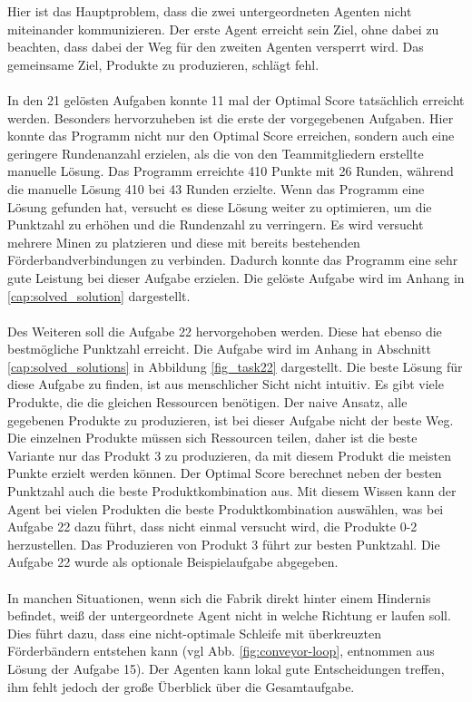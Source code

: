 Hier ist das Hauptproblem, dass die zwei untergeordneten Agenten nicht miteinander kommunizieren. Der erste Agent erreicht sein Ziel, ohne dabei zu beachten, dass dabei der Weg für den zweiten Agenten versperrt wird. Das gemeinsame Ziel, Produkte zu produzieren, schlägt fehl. 
\\\\
In den 21 gelösten Aufgaben konnte 11 mal der Optimal Score tatsächlich erreicht werden. Besonders hervorzuheben ist die erste der vorgegebenen Aufgaben.  Hier konnte das Programm nicht nur den Optimal Score erreichen, sondern auch eine geringere Rundenanzahl erzielen, als die von den Teammitgliedern erstellte manuelle Lösung. Das Programm erreichte 410 Punkte mit 26 Runden, während die manuelle Lösung 410 bei 43 Runden erzielte. Wenn das Programm eine Lösung gefunden hat, versucht es diese Lösung weiter zu optimieren, um die Punktzahl zu erhöhen und die Rundenzahl zu verringern. Es wird versucht mehrere Minen zu platzieren und diese mit bereits bestehenden Förderbandverbindungen zu verbinden. Dadurch konnte das Programm eine sehr gute Leistung bei dieser Aufgabe erzielen.
Die gelöste Aufgabe wird im Anhang in \ref{cap:solved_solution} dargestellt.
\\\\
Des Weiteren soll die Aufgabe 22 hervorgehoben werden.  Diese hat ebenso die bestmögliche Punktzahl erreicht. Die Aufgabe wird im Anhang in Abschnitt \ref{cap:solved_solutions} in Abbildung \ref{fig_task22} dargestellt. Die beste Lösung für diese Aufgabe zu finden, ist aus menschlicher Sicht nicht intuitiv. Es gibt viele Produkte, die die gleichen Ressourcen benötigen. Der naive Ansatz, alle gegebenen Produkte zu produzieren, ist bei dieser Aufgabe nicht der beste Weg. Die einzelnen Produkte müssen sich Ressourcen teilen, daher ist die beste Variante nur das Produkt 3 zu produzieren, da mit diesem Produkt die meisten Punkte erzielt werden können. Der Optimal Score berechnet neben der besten Punktzahl auch die beste Produktkombination aus. Mit diesem Wissen kann der Agent bei vielen Produkten die beste Produktkombination auswählen, was bei Aufgabe 22 dazu führt, dass nicht einmal versucht wird, die Produkte 0-2 herzustellen. Das Produzieren von Produkt 3 führt zur besten Punktzahl. Die Aufgabe 22 wurde als optionale Beispielaufgabe abgegeben.
\\\\
In manchen Situationen, wenn sich die Fabrik direkt hinter einem Hindernis befindet, weiß der untergeordnete Agent nicht in welche Richtung er laufen soll. Dies führt dazu, dass eine nicht-optimale Schleife mit überkreuzten Förderbändern entstehen kann (vgl Abb. \ref{fig:conveyor-loop}, entnommen aus Lösung der Aufgabe 15). Der Agenten kann lokal gute Entscheidungen treffen, ihm fehlt jedoch der große Überblick über die Gesamtaufgabe.

